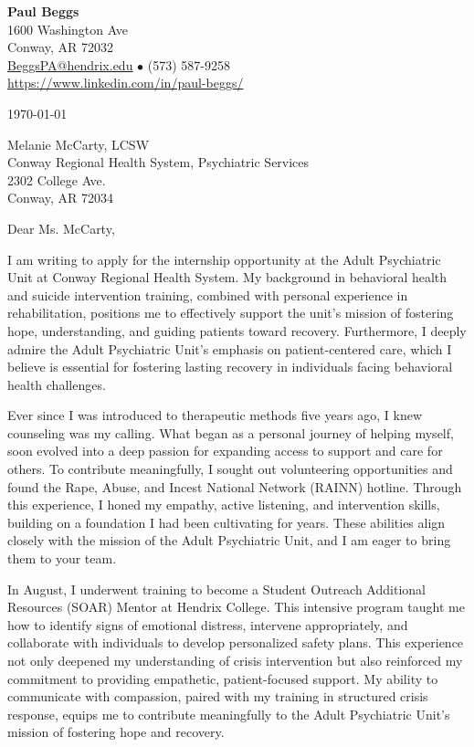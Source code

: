 \documentclass[11pt,letterpaper]{article}
\begin{document}
\begin{center}
    \LARGE \textbf{Paul Beggs} \\
    \vspace{0.2cm}
    \normalsize
    1600 Washington Ave \\
    Conway, AR 72032 \\
    \href{mailto:BeggsPA@hendrix.edu}{BeggsPA@hendrix.edu} \(\bullet\) (573) 587-9258 \\
    \url{https://www.linkedin.com/in/paul-beggs/}
\end{center}

\vspace{0.25cm}
\singlespacing




\today

Melanie McCarty, LCSW \\
Conway Regional Health System, Psychiatric Services \\
2302 College Ave.\\
Conway, AR 72034

Dear Ms. McCarty,

I am writing to apply for the internship opportunity at the Adult Psychiatric Unit at Conway Regional Health System. My background in behavioral health and suicide intervention training, combined with personal experience in rehabilitation, positions me to effectively support the unit's mission of fostering hope, understanding, and guiding patients toward recovery. Furthermore, I deeply admire the Adult Psychiatric Unit's emphasis on patient-centered care, which I believe is essential for fostering lasting recovery in individuals facing behavioral health challenges.


Ever since I was introduced to therapeutic methods five years ago, I knew counseling was my calling. What began as a personal journey of helping myself, soon evolved into a deep passion for expanding access to support and care for others. To contribute meaningfully, I sought out volunteering opportunities and found the Rape, Abuse, and Incest National Network (RAINN) hotline. Through this experience, I honed my empathy, active listening, and intervention skills, building on a foundation I had been cultivating for years. These abilities align closely with the mission of the Adult Psychiatric Unit, and I am eager to bring them to your team.

In August, I underwent training to become a Student Outreach Additional Resources (SOAR) Mentor at Hendrix College. This intensive program taught me how to identify signs of emotional distress, intervene appropriately, and collaborate with individuals to develop personalized safety plans. This experience not only deepened my understanding of crisis intervention but also reinforced my commitment to providing empathetic, patient-focused support. My ability to communicate with compassion, paired with my training in structured crisis response, equips me to contribute meaningfully to the Adult Psychiatric Unit’s mission of fostering hope and recovery.
\end{document}

